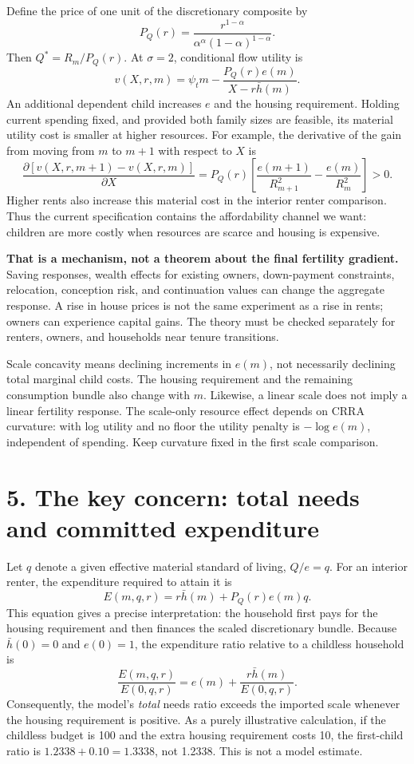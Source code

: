 \documentclass[11pt,letterpaper]{article}
\newcommand{\hh}{\bar h}
\newcommand{\page}[1]{\newpage\section*{#1}}
\begin{document}
Define the price of one unit of the discretionary composite by
\[
P_Q(r)=\frac{r^{1-\alpha}}{\alpha^\alpha(1-\alpha)^{1-\alpha}}.
\]
Then $Q^*=R_m/P_Q(r)$. At $\sigma=2$, conditional flow utility is
\[
v(X,r,m)=\psi_t m-\frac{P_Q(r)e(m)}{X-r\hh(m)}.
\]
An additional dependent child increases $e$ and the housing requirement. Holding current spending fixed, and provided both family sizes are feasible, its material utility cost is smaller at higher resources. For example, the derivative of the gain from moving from $m$ to $m+1$ with respect to $X$ is
\[
\frac{\partial[v(X,r,m+1)-v(X,r,m)]}{\partial X}
=P_Q(r)\left[\frac{e(m+1)}{R_{m+1}^2}-\frac{e(m)}{R_m^2}\right]>0.
\]
Higher rents also increase this material cost in the interior renter comparison. Thus the current specification contains the affordability channel we want: children are more costly when resources are scarce and housing is expensive.

\textbf{That is a mechanism, not a theorem about the final fertility gradient.} Saving responses, wealth effects for existing owners, down-payment constraints, relocation, conception risk, and continuation values can change the aggregate response. A rise in house prices is not the same experiment as a rise in rents; owners can experience capital gains. The theory must be checked separately for renters, owners, and households near tenure transitions.

Scale concavity means declining increments in $e(m)$, not necessarily declining total marginal child costs. The housing requirement and the remaining consumption bundle also change with $m$. Likewise, a linear scale does not imply a linear fertility response. The scale-only resource effect depends on CRRA curvature: with log utility and no floor the utility penalty is $-\log e(m)$, independent of spending. Keep curvature fixed in the first scale comparison.

\page{5. The key concern: total needs and committed expenditure}
Let $q$ denote a given effective material standard of living, $Q/e=q$. For an interior renter, the expenditure required to attain it is
\[
\boxed{\quad E(m,q,r)=r\hh(m)+P_Q(r)e(m)q.\quad}
\]
This equation gives a precise interpretation: the household first pays for the housing requirement and then finances the scaled discretionary bundle. Because $\hh(0)=0$ and $e(0)=1$, the expenditure ratio relative to a childless household is
\[
\frac{E(m,q,r)}{E(0,q,r)}
=e(m)+\frac{r\hh(m)}{E(0,q,r)}.
\]
Consequently, the model's \emph{total} needs ratio exceeds the imported scale whenever the housing requirement is positive. As a purely illustrative calculation, if the childless budget is 100 and the extra housing requirement costs 10, the first-child ratio is $1.2338+0.10=1.3338$, not 1.2338. This is not a model estimate.
\end{document}
